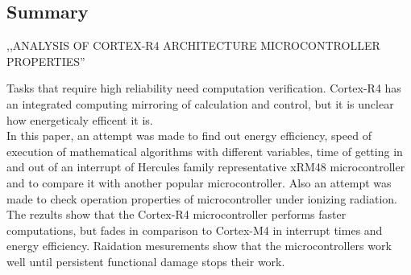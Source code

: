 \documentclass[a4paper, 12pt]{article} %
\newcommand{\studentas}{Mindaugas Kurmauskas} %
\begin{document}
\begin{onehalfspacing}

\section*{Summary}


\begin{center}


\MakeUppercase{,,Analysis of Cortex-R4 Architecture Microcontroller Properties''}\\


\end{center}

Tasks that require high reliability need computation verification. Cortex-R4 has an integrated computing mirroring of calculation and control, but it is unclear how energeticaly efficent it is. \\
\indent In this paper, an attempt was made to find out energy efficiency, speed of execution of mathematical algorithms with different variables, time of getting in and out of an interrupt of Hercules family representative xRM48 microcontroller and to compare it with another popular microcontroller. Also an attempt was made to check operation properties of microcontroller under ionizing radiation. \\
\indent
The rezults show that the Cortex-R4 microcontroller performs faster computations, but fades in comparison to Cortex-M4 in interrupt times and energy efficiency. Raidation mesurements show that the microcontrollers work well until persistent functional damage stops their work.

\end{onehalfspacing}
\end{document}
